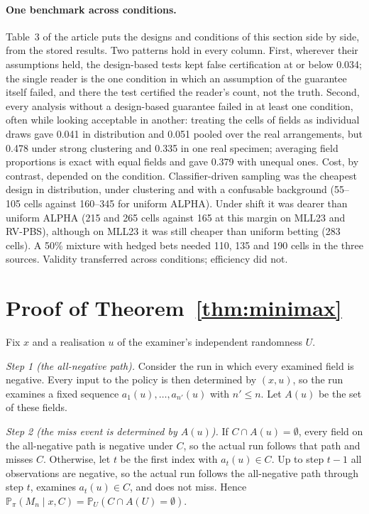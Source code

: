 \documentclass[11pt]{article}
\theoremstyle{remark}
\theoremstyle{definition}
\newcommand{\Prb}{\mathbb{P}}
\begin{document}
\paragraph{One benchmark across conditions.} Table~3 of the article puts the designs and conditions of this section side by side, from the stored results. Two patterns hold in every column. First, wherever their assumptions held, the design-based tests kept false certification at or below 0.034; the single reader is the one condition in which an assumption of the guarantee itself failed, and there the test certified the reader's count, not the truth. Second, every analysis without a design-based guarantee failed in at least one condition, often while looking acceptable in another: treating the cells of fields as individual draws gave 0.041 in distribution and 0.051 pooled over the real arrangements, but 0.478 under strong clustering and 0.335 in one real specimen; averaging field proportions is exact with equal fields and gave 0.379 with unequal ones. Cost, by contrast, depended on the condition. Classifier-driven sampling was the cheapest design in distribution, under clustering and with a confusable background (55--105 cells against 160--345 for uniform ALPHA). Under shift it was dearer than uniform ALPHA (215 and 265 cells against 165 at this margin on MLL23 and RV-PBS), although on MLL23 it was still cheaper than uniform betting (283 cells). A 50\% mixture with hedged bets needed 110, 135 and 190 cells in the three sources. Validity transferred across conditions; efficiency did not.




\section{Proof of Theorem~\ref{thm:minimax}}\label{app:proof}
Fix $x$ and a realisation $u$ of the examiner's independent randomness $U$.

\emph{Step 1 (the all-negative path).} Consider the run in which every examined field is negative. Every input to the policy is then determined by $(x,u)$, so the run examines a fixed sequence $a_1(u),\dots,a_{n'}(u)$ with $n'\le n$. Let $A(u)$ be the set of these fields.

\emph{Step 2 (the miss event is determined by $A(u)$).} If $C\cap A(u)=\emptyset$, every field on the all-negative path is negative under $C$, so the actual run follows that path and misses $C$. Otherwise, let $t$ be the first index with $a_t(u)\in C$. Up to step $t-1$ all observations are negative, so the actual run follows the all-negative path through step $t$, examines $a_t(u)\in C$, and does not miss. Hence $\Prb_\pi(M_n\mid x,C)=\Prb_U(C\cap A(U)=\emptyset)$.
\end{document}
